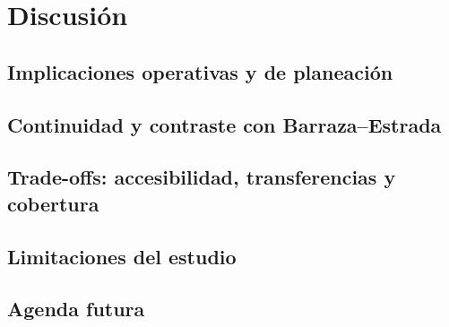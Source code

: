\chapter{Discusión}
    \section{Implicaciones operativas y de planeación}
    \section{Continuidad y contraste con Barraza--Estrada}
    \section{Trade-offs: accesibilidad, transferencias y cobertura}
    \section{Limitaciones del estudio}
    \section{Agenda futura}
